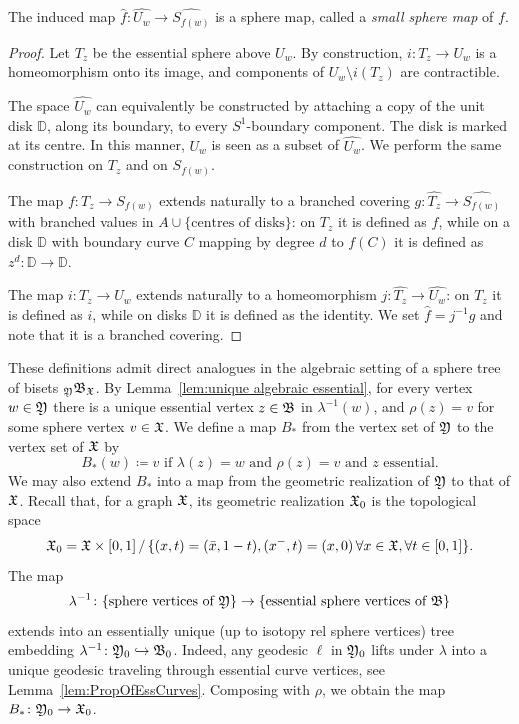 \documentclass{amsart}
\begin{document}
\begin{lemdef}\label{lem:SmallMaps}
  The induced map $\widehat f\colon \widehat{U_w}\to \widehat{S_{f(w)}}$ is a
  sphere map, called a \emph{small sphere map} of $f$.
\end{lemdef}
\begin{proof}
  Let $T_z$ be the essential sphere above $U_w$. By construction,
  $i\colon T_z\to U_w$ is a homeomorphism onto its image, and
  components of $U_w\setminus i(T_z)$ are contractible.

  The space $\widehat{U_w}$ can equivalently be constructed by
  attaching a copy of the unit disk $\mathbb D$, along its boundary,
  to every $S^1$-boundary component. The disk is marked at its
  centre. In this manner, $U_w$ is seen as a subset of
  $\widehat{U_w}$.  We perform the same construction on $T_z$ and on
  $S_{f(w)}$.

  The map $f\colon T_z\to S_{f(w)}$ extends naturally to a branched
  covering $g\colon\widehat{T_z}\to\widehat{S_{f(w)}}$ with branched
  values in $A\cup\{\text{centres of disks}\}$: on $T_z$ it is defined
  as $f$, while on a disk $\mathbb D$ with boundary curve $C$ mapping
  by degree $d$ to $f(C)$ it is defined as $z^d\colon\mathbb
  D\to\mathbb D$.

  The map $i\colon T_z\to U_w$ extends naturally to a homeomorphism
  $j\colon\widehat{T_z}\to\widehat{U_w}$: on $T_z$ it is defined as
  $i$, while on disks $\mathbb D$ it is defined as the identity. We
  set $\widehat f=j^{-1}g$ and note that it is a branched covering.
\end{proof}

These definitions admit direct analogues in the algebraic setting of a
sphere tree of bisets $\subscript\gfY\gfB_\gf$. By
Lemma~\ref{lem:unique algebraic essential}, for every vertex
$w\in{\mathfrak Y}$ there is a unique essential vertex $z\in{\mathfrak B}$
in $\lambda^{-1}(w)$, and $\rho(z)=v$ for some sphere vertex
$v\in{\mathfrak X}$. We define a map $B_*$ from the vertex set of ${\mathfrak Y}$
to the vertex set of ${\mathfrak X}$ by
\[B_*(w)\coloneqq v\text{ if $\lambda(z)=w$ and $\rho(z)=v$ and $z$ essential.}\]
We may also extend $B_*$ into a map from the geometric realization of
${\mathfrak Y}$ to that of ${\mathfrak X}$. Recall that, for a graph ${\mathfrak X}$, its
geometric realization ${\mathfrak X}_0$ is the topological space
\[{\mathfrak X}_0={\mathfrak X}\times[0,1]\,/\,\{(x,t)=(\bar x,1-t),(x^-,t)=(x,0)\,\forall x\in{\mathfrak X},\forall t\in[0,1]\}.\]
The map
\[\lambda^{-1}\colon \{\text{sphere vertices of }{\mathfrak Y}\}\to
\{\text{essential sphere vertices of }{\mathfrak B}\}
\]
extends into an essentially unique (up to isotopy rel sphere vertices)
tree embedding $\lambda^{-1}\colon {\mathfrak Y}_0\hookrightarrow
{\mathfrak B}_0$. Indeed, any geodesic $\ell$ in ${\mathfrak Y}_0$ lifts under $\lambda$
into a unique geodesic traveling through essential curve vertices, see
Lemma~\ref{lem:PropOfEssCurves}. Composing with $\rho$, we obtain the
map $B_*\colon {\mathfrak Y}_0\to{\mathfrak X}_0$.
\end{document}
